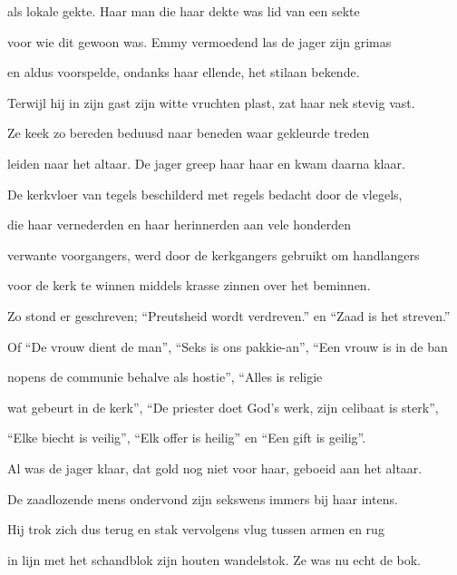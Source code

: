 als lokale gekte.
Haar man die haar dekte
was lid van een sekte

voor wie dit gewoon was.
Emmy vermoedend las
de jager zijn grimas

en aldus voorspelde,
ondanks haar ellende,
het stilaan bekende.

Terwijl hij in zijn gast
zijn witte vruchten plast,
zat haar nek stevig vast.

Ze keek zo bereden
beduusd naar beneden
waar gekleurde treden

leiden naar het altaar.
De jager greep haar haar
en kwam daarna klaar.

De kerkvloer van tegels
beschilderd met regels
bedacht door de vlegels,

die haar vernederden
en haar herinnerden
aan vele honderden

verwante voorgangers,
werd door de kerkgangers
gebruikt om handlangers

voor de kerk te winnen
middels krasse zinnen
over het beminnen.

Zo stond er geschreven;
“Preutsheid wordt verdreven.”
en “Zaad is het streven.”

Of  “De vrouw dient de man”,
“Seks is ons pakkie-an”,
“Een vrouw is in de ban

nopens de communie
behalve als hostie”,
“Alles is religie

wat gebeurt in de kerk”,
“De priester doet God’s werk,
zijn celibaat is sterk”,

“Elke biecht is veilig”,
“Elk offer is heilig”
en “Een gift is geilig”.

Al was de jager klaar,
dat gold nog niet voor haar,
geboeid aan het altaar.

De zaadlozende mens
ondervond zijn sekswens
immers bij haar intens.

Hij trok zich dus terug
en stak vervolgens vlug
tussen armen en rug

in lijn met het schandblok
zijn houten wandelstok.
Ze was nu echt de bok.
